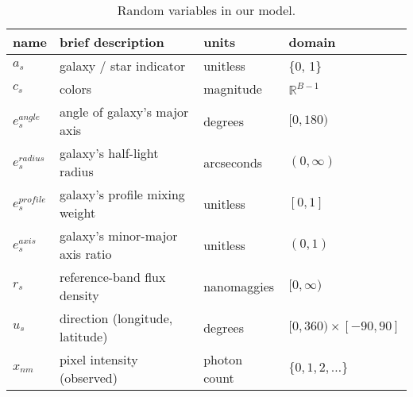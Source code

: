\begin{table}
\centering
\caption{Random variables in our model.}
\centering
\begin{tabular}{llll}
\hline
\textbf{name} & \textbf{brief description} & \textbf{units} & \textbf{domain} \\
\hline
$a_s$           & galaxy / star indicator & unitless & \{0, 1\} \\
$c_s$           & colors & magnitude & $\mathbb R^{B-1}$ \\
$e_s^{angle}$   & angle of galaxy's major axis & degrees & $[0, 180)$ \\
$e_s^{radius}$  & galaxy's half-light radius & arcseconds & $(0, \infty)$ \\
$e_s^{profile}$ & galaxy's profile mixing weight & unitless & $[0, 1]$ \\
$e_s^{axis}$    & galaxy's minor-major axis ratio & unitless & $(0, 1)$ \\
$r_s$           & reference-band flux density & nanomaggies & $[0, \infty)$ \\
$u_s$           & direction (longitude, latitude) & degrees & $[0, 360) \times [-90, 90]$ \\
$x_{nm}$        & pixel intensity (observed) & photon count & $\{0,1,2,\ldots\}$ \\
\hline
\end{tabular}
\label{rv-table}
\end{table}

